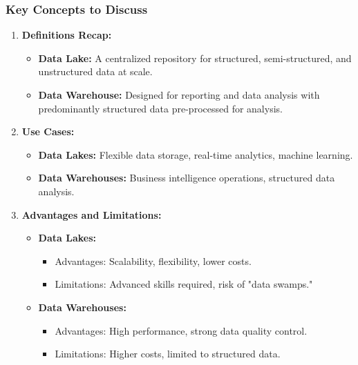 \documentclass[aspectratio=169]{beamer}
\begin{document}
\begin{frame}[fragile]
    \frametitle{Key Concepts to Discuss}
    \begin{enumerate}
        \item \textbf{Definitions Recap:}
        \begin{itemize}
            \item \textbf{Data Lake:} A centralized repository for structured, semi-structured, and unstructured data at scale.
            \item \textbf{Data Warehouse:} Designed for reporting and data analysis with predominantly structured data pre-processed for analysis.
        \end{itemize}
        
        \item \textbf{Use Cases:}
        \begin{itemize}
            \item \textbf{Data Lakes:} Flexible data storage, real-time analytics, machine learning.
            \item \textbf{Data Warehouses:} Business intelligence operations, structured data analysis.
        \end{itemize}
        
        \item \textbf{Advantages and Limitations:}
        \begin{itemize}
            \item \textbf{Data Lakes:} 
            \begin{itemize}
                \item Advantages: Scalability, flexibility, lower costs.
                \item Limitations: Advanced skills required, risk of "data swamps."
            \end{itemize}
            \item \textbf{Data Warehouses:} 
            \begin{itemize}
                \item Advantages: High performance, strong data quality control.
                \item Limitations: Higher costs, limited to structured data.
            \end{itemize}
        \end{itemize}
    \end{enumerate}
\end{frame}
\end{document}
